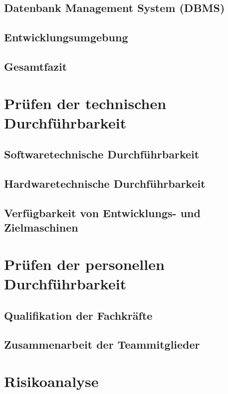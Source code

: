 \documentclass[a4paper,12pt]{scrreprt}
\begin{document}
		\subsection{Datenbank Management System (DBMS)}	
		
		\subsection{Entwicklungsumgebung}
		
		\subsection{Gesamtfazit}
			
	\section{Pr\"ufen der technischen Durchf\"uhrbarkeit}
		
		\subsection{Softwaretechnische Durchf\"uhrbarkeit}
			
		\subsection{Hardwaretechnische Durchf\"uhrbarkeit}
			
		\subsection{Verfügbarkeit von Entwicklungs- und Zielmaschinen}
			
	\section{Pr\"ufen der personellen Durchf\"uhrbarkeit}
		
		\subsection{Qualifikation der Fachkr\"afte}
			
		\subsection{Zusammenarbeit der Teammitglieder}
			
	\section{Risikoanalyse}
		
\end{document}
